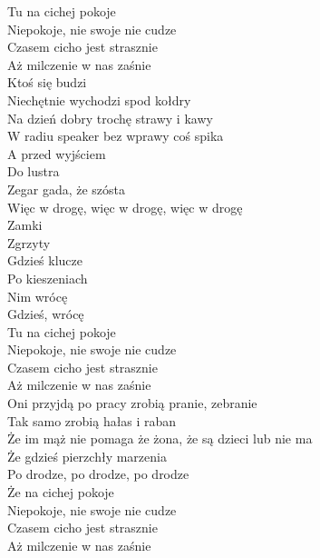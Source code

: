 \begin{text}
    Tu na cichej pokoje\\
    Niepokoje, nie swoje nie cudze\\
    Czasem cicho jest strasznie\\
    Aż milczenie w nas zaśnie\\
    Ktoś się budzi\\
    Niechętnie wychodzi spod kołdry\\
    Na dzień dobry trochę strawy i kawy\\
    W radiu speaker bez wprawy coś spika\\
    A przed wyjściem\\
    Do lustra\\
    Zegar gada, że szósta\\
    Więc w drogę, więc w drogę, więc w drogę\\
    Zamki\\
    Zgrzyty\\
    Gdzieś klucze\\
    Po kieszeniach\\
    Nim wrócę\\
    Gdzieś, wrócę\\
    Tu na cichej pokoje\\
    Niepokoje, nie swoje nie cudze\\
    Czasem cicho jest strasznie\\
    Aż milczenie w nas zaśnie\\
    Oni przyjdą po pracy zrobią pranie, zebranie\\
    Tak samo zrobią hałas i raban\\
    Że im mąż nie pomaga że żona, że są dzieci lub nie ma\\
    Że gdzieś pierzchły marzenia\\
    Po drodze, po drodze, po drodze\\
    Że na cichej pokoje\\
    Niepokoje, nie swoje nie cudze\\
    Czasem cicho jest strasznie\\
    Aż milczenie w nas zaśnie
\end{text}
\begin{chord}

\end{chord}